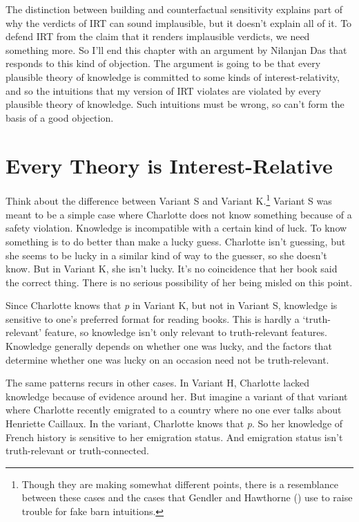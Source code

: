 \documentclass[
  12pt,
  letterpaper,
]{scrbook}
\begin{document}
The distinction between building and counterfactual sensitivity explains
part of why the verdicts of IRT can sound implausible, but it doesn't
explain all of it. To defend IRT from the claim that it renders
implausible verdicts, we need something more. So I'll end this chapter
with an argument by Nilanjan Das that responds to this kind of
objection. The argument is going to be that every plausible theory of
knowledge is committed to some kinds of interest-relativity, and so the
intuitions that my version of IRT violates are violated by every
plausible theory of knowledge. Such intuitions must be wrong, so can't
form the basis of a good objection.

\section{Every Theory is Interest-Relative}\label{sec-das}

Think about the difference between Variant S and Variant K.\footnote{Though
  they are making somewhat different points, there is a resemblance
  between these cases and the cases that Gendler and Hawthorne
  () use to raise trouble for fake barn
  intuitions.} Variant S was meant to be a simple case where Charlotte
does not know something because of a safety violation. Knowledge is
incompatible with a certain kind of luck. To know something is to do
better than make a lucky guess. Charlotte isn't guessing, but she seems
to be lucky in a similar kind of way to the guesser, so she doesn't
know. But in Variant K, she isn't lucky. It's no coincidence that her
book said the correct thing. There is no serious possibility of her
being misled on this point.

Since Charlotte knows that \emph{p} in Variant K, but not in Variant S,
knowledge is sensitive to one's preferred format for reading books. This
is hardly a `truth-relevant' feature, so knowledge isn't only relevant
to truth-relevant features. Knowledge generally depends on whether one
was lucky, and the factors that determine whether one was lucky on an
occasion need not be truth-relevant.

The same patterns recurs in other cases. In Variant H, Charlotte lacked
knowledge because of evidence around her. But imagine a variant of that
variant where Charlotte recently emigrated to a country where no one
ever talks about Henriette Caillaux. In the variant, Charlotte knows
that \emph{p}. So her knowledge of French history is sensitive to her
emigration status. And emigration status isn't truth-relevant or
truth-connected.
\end{document}

